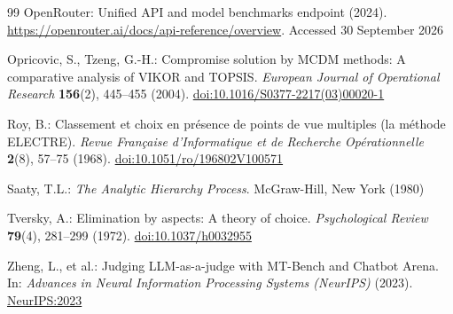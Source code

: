 \documentclass[pdflatex,sn-mathphys-num]{sn-jnl}
\theoremstyle{thmstyleone}
\theoremstyle{thmstylethree}
\begin{document}
\begin{thebibliography}{99}
OpenRouter: Unified API and model benchmarks endpoint (2024). \href{https://openrouter.ai/docs/api-reference/overview}{https://openrouter.ai/docs/api-reference/overview}. Accessed 30 September 2026

Opricovic, S., Tzeng, G.-H.: Compromise solution by MCDM methods: A comparative analysis of VIKOR and TOPSIS. \emph{European Journal of Operational Research} \textbf{156}(2), 445--455 (2004). \href{https://doi.org/10.1016/S0377-2217(03)00020-1}{doi:10.1016/S0377-2217(03)00020-1}

Roy, B.: Classement et choix en pr\'esence de points de vue multiples (la m\'ethode ELECTRE). \emph{Revue Fran\c{c}aise d'Informatique et de Recherche Op\'erationnelle} \textbf{2}(8), 57--75 (1968). \href{https://doi.org/10.1051/ro/196802V100571}{doi:10.1051/ro/196802V100571}

Saaty, T.L.: \emph{The Analytic Hierarchy Process}. McGraw-Hill, New York (1980)

Tversky, A.: Elimination by aspects: A theory of choice. \emph{Psychological Review} \textbf{79}(4), 281--299 (1972). \href{https://doi.org/10.1037/h0032955}{doi:10.1037/h0032955}

Zheng, L., et al.: Judging LLM-as-a-judge with MT-Bench and Chatbot Arena. In: \emph{Advances in Neural Information Processing Systems (NeurIPS)} (2023). \href{https://proceedings.neurips.cc/paper_files/paper/2023/hash/91f18a1287b30030061e38b76c8c4599-Abstract-Conference.html}{NeurIPS:2023}

\end{thebibliography}
\end{document}

